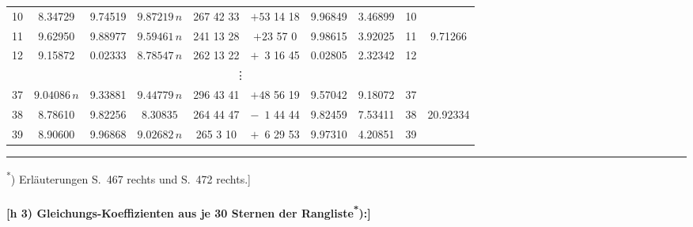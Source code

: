 \documentclass[12pt,a4paper]{article}
\theoremstyle{plain}
\theoremstyle{definition}
\theoremstyle{remark}
\begin{document}
\begin{small}
\begin{center}
\begin{tabular}{|c||c|c|c||c|c||c||c||c|c|}
10 & 8.34729 & 9.74519 & $9.87219\,n$ & 267 42 33 & $+53$ 14 18 & 9.96849 & 3.46899 & 10 & \\
11 & 9.62950 & 9.88977 & $9.59461\,n$ & 241 13 28 & $+23$ 57 \phantom{0}0 & 9.98615 & 3.92025 & 11 & 9.71266 \\
12 & 9.15872 & 0.02333 & $8.78547\,n$ & 262 13 22 & $+\phantom{0}3$ 16 45 & 0.02805 & 2.32342 & 12 & \\
\hline
\multicolumn{10}{c}{\vdots} \\
\hline
37 & $9.04086\,n$ & 9.33881 & $9.44779\,n$ & 296 43 41 & $+48$ 56 19 & 9.57042 & 9.18072 & 37 & \\
38 & 8.78610 & 9.82256 & $8.30835$ & 264 44 47 & $-\phantom{0}1$ 44 44 & 9.82459 & 7.53411 & 38 & 20.92334 \\
39 & 8.90600 & 9.96868 & $9.02682\,n$ & 265 \phantom{0}3 10 & $+\phantom{0}6$ 29 53 & 9.97310 & 4.20851 & 39 & \\
\hline
\end{tabular}
\end{center}
\end{small}

\medskip
\noindent\rule{\textwidth}{0.4pt}
\begin{footnotesize}
\textsuperscript{*}) Erl\"auterungen S.~467 rechts und S.~472 rechts.]
\end{footnotesize}

\newpage
\paragraph*{[h 3) Gleichungs-Koeffizienten aus je 30 Sternen der Rangliste\textsuperscript{*}):]}
\end{document}

